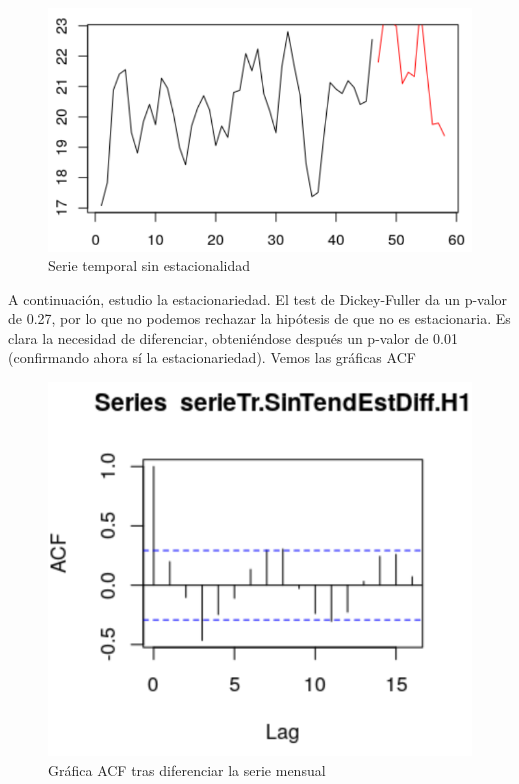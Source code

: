  \begin{figure}[H] %
	\centering
	\includegraphics[scale=0.31]{mensual-sinest.png}  %
	\caption{Serie temporal sin estacionalidad} 
	\label{fig:mensual-sinest}
\end{figure}

A continuación, estudio la estacionariedad. El test de Dickey-Fuller da un p-valor de 0.27, por lo que no podemos rechazar la hipótesis de que no es estacionaria. Es clara la necesidad de diferenciar, obteniéndose después un p-valor de 0.01 (confirmando ahora sí la estacionariedad). Vemos las gráficas ACF

 \begin{figure}[H] %
	\centering
	\includegraphics[scale=0.31]{acf2-mensual.png}  %
	\caption{Gráfica ACF tras diferenciar la serie mensual} 
	\label{fig:acf-mensual}
\end{figure}


